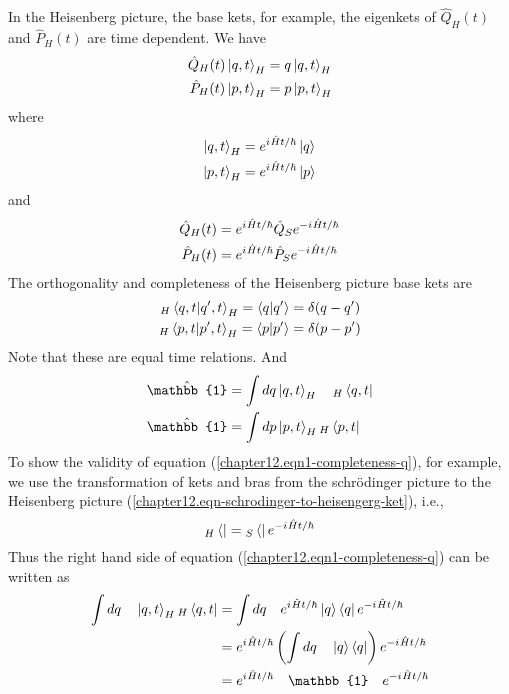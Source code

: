 \begin{enumerate}
	In the Heisenberg picture, the base kets, for example, the eigenkets of $\hat{Q}_H(t)$ and $\hat{P}_H(t)$ are time dependent. We have
	\begin{align}
		\hat{Q}_H(t) \ket{q,t}_H &= q \ket{q,t}_H \\
		\hat{P}_H(t) \ket{p,t}_H &= p \ket{p,t}_H
	\end{align}
	where
	\begin{align}
		\ket{q,t}_H &= e^{{i\mkern1mu} \hat{H}t/\hbar}\ket{q}\\
		\ket{p,t}_H &= e^{{i\mkern1mu} \hat{H}t/\hbar}\ket{p}
	\end{align}
	and
	\begin{align}
		\hat{Q}_H(t) &= e^{{i\mkern1mu} \hat{H}t/\hbar} \hat{Q}_S e^{-{i\mkern1mu} \hat{H}t/\hbar}\\
		\hat{P}_H(t) &= e^{{i\mkern1mu} \hat{H}t/\hbar} \hat{P}_S e^{-{i\mkern1mu} \hat{H}t/\hbar}
	\end{align}
	The orthogonality and completeness of the Heisenberg picture base kets are
	\begin{align}
		_H\braket{q,t}{q^\prime,t}_H = \braket{q}{q^\prime} &=  \delta(q-q^\prime) \\
		_H\braket{p,t}{p^\prime,t}_H = \braket{p}{p^\prime} &=  \delta(p-p^\prime) 
	\end{align}
	Note that these are equal time relations. And
	\begin{align}
		\hat{\mathbb{1}} &= \int dq \ket{q,t}_H\quad {_H}\bra{q,t}\label{chapter12.eqn1-completeness-q}\\
		\hat{\mathbb{1}} &= \int dp \ket{p,t}_H {_H}\bra{p,t}\label{chapter12.eqn1-completeness-p}
	\end{align}
	To show the validity of equation (\ref{chapter12.eqn1-completeness-q}), for example, we use the transformation of kets and bras from the schr\"{o}dinger picture to the Heisenberg picture (\ref{chapter12.eqn-schrodinger-to-heisengerg-ket}), i.e., 
	\begin{equation}
		{_H}\bra{} = {_S}\bra{} e^{-{i\mkern1mu} \hat{H}t/\hbar} 
	\end{equation}
	Thus the right hand side of equation (\ref{chapter12.eqn1-completeness-q}) can be written as
	\begin{align}
		\int dq \quad \ket{q,t}_H {_H}\bra{q,t} &= \int dq \quad e^{\iu \hat{H}t/\hbar}\ket{q} \bra{q}e^{-\iu \hat{H}t/\hbar} \\
		&= e^{\iu \hat{H}t/\hbar}\left(\int dq \quad \ket{q} \bra{q}\right)e^{-\iu \hat{H}t/\hbar} \\
		&= e^{\iu \hat{H}t/\hbar}\quad\mathbb{1}\quad e^{-\iu \hat{H}t/\hbar} \\

\end{align}
\end{enumerate}
